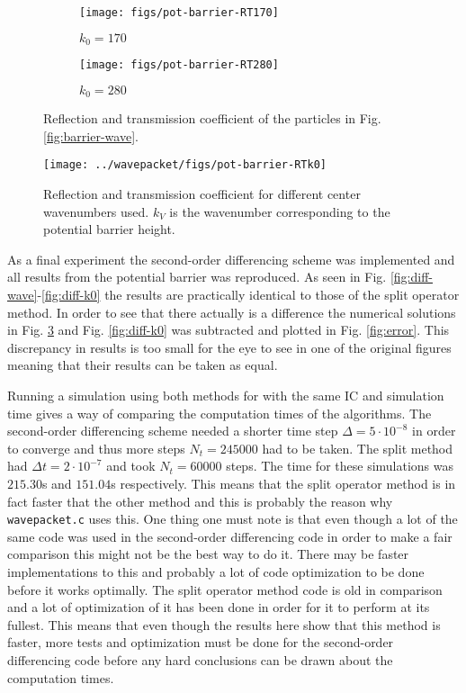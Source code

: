 \begin{figure}[H]
  \centering
  \begin{subfigure}{0.49\textwidth}
  \texttt{[image: figs/pot-barrier-RT170]}
  \caption{$k_0 = 170$}
  \label{fig:barrier_RT170}
  \end{subfigure}
  \begin{subfigure}{0.49\textwidth}
  \texttt{[image: figs/pot-barrier-RT280]}
  \caption{$k_0 = 280$}
  \end{subfigure}
  \caption{Reflection and transmission coefficient of the particles in Fig. \ref{fig:barrier-wave}.}
  \label{fig:barrier-RT}
\end{figure}

\begin{figure}[H]
  \centering
  \texttt{[image: ../wavepacket/figs/pot-barrier-RTk0]}
  \caption{Reflection and transmission coefficient for different center wavenumbers used. $k_V$ is the wavenumber corresponding to the potential barrier height.}
  \label{fig:barrier-k0}
\end{figure}


As a final experiment the second-order differencing scheme was implemented and all results from the potential barrier was reproduced. As seen in Fig. \ref{fig:diff-wave}-\ref{fig:diff-k0} the results are practically identical to those of the split operator method. In order to see that there actually is a difference the numerical solutions in Fig. \ref{fig:barrier-k0} and Fig. \ref{fig:diff-k0} was subtracted and plotted in Fig. \ref{fig:error}. This discrepancy in results is too small for the eye to see in one of the original figures meaning that their results can be taken as equal.

Running a simulation using both methods for with the same IC and simulation time gives a way of comparing the computation times of the algorithms. The second-order differencing scheme needed a shorter time step $\Delta = 5 \cdot 10^{-8}$ in order to converge and thus more steps $N_t = 245000$ had to be taken. The split method had $\Delta t = 2 \cdot 10^{-7}$ and took $N_t = 60000$ steps. The time for these simulations was $215.30$s and $151.04$s respectively. This means that the split operator method is in fact faster that the other method and this is probably the reason why \verb|wavepacket.c| uses this. One thing one must note is that even though a lot of the same code was used in the second-order differencing code in order to make a fair comparison this might not be the best way to do it. There may be faster implementations to this and probably a lot of code optimization to be done before it works optimally. The split operator method code is old in comparison and a lot of optimization of it has been done in order for it to perform at its fullest. This means that even though the results here show that this method is faster, more tests and optimization must be done for the second-order differencing code before any hard conclusions can be drawn about the computation times.

